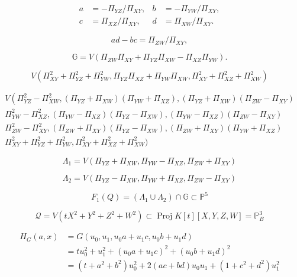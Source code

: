 
\[
	\begin{aligned}
		a&=-\Pi_{YZ}/\Pi_{XY},&b&=-\Pi_{YW}/\Pi_{XY},\\
		c&=\Pi_{XZ}/\Pi_{XY},&d&=\Pi_{XW}/\Pi_{XY}.
	\end{aligned}
\]

\[
	ad-bc=\Pi_{ZW}/\Pi_{XY},
\]

\[
	\mathbb G=V(\Pi_{ZW}\Pi_{XY}+\Pi_{YZ}\Pi_{XW}-\Pi_{XZ}\Pi_{YW}).
\]

\[
	V(\Pi_{XY}^2+\Pi_{YZ}^2+\Pi_{YW}^2,\Pi_{YZ}\Pi_{XZ}+\Pi_{YW}\Pi_{XW},\Pi_{XY}^2+\Pi_{XZ}^2+\Pi_{XW}^2)
\]

\[
\begin{array}{l}{V\left(\Pi_{Y Z}^{2}-\Pi_{X W}^{2},\left(\Pi_{Y Z}+\Pi_{X W}\right)\left(\Pi_{Y W}+\Pi_{X Z}\right),\left(\Pi_{Y Z}+\Pi_{X W}\right)\left(\Pi_{Z W}-\Pi_{X Y}\right)\right.} \\ {\Pi_{Y W}^{2}-\Pi_{X Z}^{2},\left(\Pi_{Y W}-\Pi_{X Z}\right)\left(\Pi_{Y Z}-\Pi_{X W}\right),\left(\Pi_{Y W}-\Pi_{X Z}\right)\left(\Pi_{Z W}-\Pi_{X Y}\right)} \\ {\Pi_{Z W}^{2}-\Pi_{X Y}^{2},\left(\Pi_{Z W}+\Pi_{X Y}\right)\left(\Pi_{Y Z}-\Pi_{X W}\right),\left(\Pi_{Z W}+\Pi_{X Y}\right)\left(\Pi_{Y W}+\Pi_{X Z}\right)} \\ {\Pi_{X Y}^{2}+\Pi_{Y Z}^{2}+\Pi_{Y W}^{2}, \Pi_{X Y}^{2}+\Pi_{X Z}^{2}+\Pi_{X W}^{2} )}\end{array}
\]

\[
	\Lambda_{1}=V\left(\Pi_{Y Z}+\Pi_{X W}, \Pi_{Y W}-\Pi_{X Z}, \Pi_{Z W}+\Pi_{X Y}\right)
\]

\[
	\Lambda_{2}=V\left(\Pi_{Y Z}-\Pi_{X W}, \Pi_{Y W}+\Pi_{X Z}, \Pi_{Z W}-\Pi_{X Y}\right)
\]

\[
	F_{1}(Q)=\left(\Lambda_{1} \cup \Lambda_{2}\right) \cap \mathbb{G} \subset \mathbb{P}^{5}
\]


\[
	\mathscr{Q}=V\left(t X^{2}+Y^{2}+Z^{2}+W^{2}\right) \subset \operatorname{Proj} K[t][X, Y, Z, W]=\mathbb{P}_{B}^{3}
\]

\[
\begin{aligned} H_{G}(a, x) &=G\left(u_{0}, u_{1}, u_{0} a+u_{1} c, u_{0} b+u_{1} d\right) \\ &=t u_{0}^{2}+u_{1}^{2}+\left(u_{0} a+u_{1} c\right)^{2}+\left(u_{0} b+u_{1} d\right)^{2} \\ &=\left(t+a^{2}+b^{2}\right) u_{0}^{2}+2(a c+b d) u_{0} u_{1}+\left(1+c^{2}+d^{2}\right) u_{1}^{2} \end{aligned}
\]

